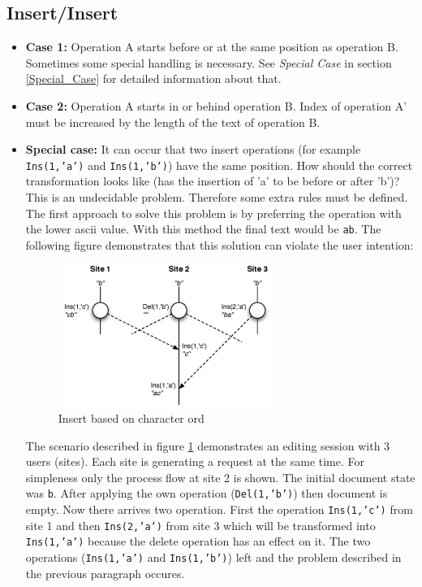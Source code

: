 \subsection{Insert/Insert}
\begin{itemize}
\item \textbf{Case 1:}
Operation A starts before or at the same position as operation B. Sometimes some special handling is necessary. See \emph{Special Case} in section \ref{Special_Case} for detailed information about that.
\item \textbf{Case 2:}
Operation A starts in or behind operation B. Index of operation A' must be increased by the length of the text of operation B.
\item \textbf{Special case:}
\label{Special_Case}
It can occur that two insert operations (for example \texttt{Ins(1,'a')} and \texttt{Ins(1,'b')}) have the same position. How should the correct transformation looks like (has the insertion of 'a' to be before or after 'b')? This is an undecidable problem. Therefore some extra rules must be defined. The first approach to solve this problem is by preferring the operation with the lower ascii value. With this method the final text would be \texttt{ab}. The following figure demonstrates that this solution can violate the user intention:
\begin{figure}[H]
\centering
\includegraphics[height=4.63cm,width=7.12cm]{../../images/algo-impl/transform_ins_ins_charpos.eps}
\caption{Insert based on character ord}
\label{Insert based on character ord}
\end{figure}
The scenario described in figure \ref{Insert based on character ord} demonstrates an editing session with 3 users (sites). Each site is generating a request at the same time. For simpleness only the process flow at site 2 is shown. The initial document state was \texttt{b}. After applying the own operation (\texttt{Del(1,'b')}) then document is empty. Now there arrives two operation. First the operation \texttt{Ins(1,'c')} from site 1 and then \texttt{Ins(2,'a')} from site 3 which will be transformed into \texttt{Ins(1,'a')} because the delete operation has an effect on it. The two operations (\texttt{Ins(1,'a')} and \texttt{Ins(1,'b')}) left and the problem described in the previous paragraph occures.


\end{itemize}
